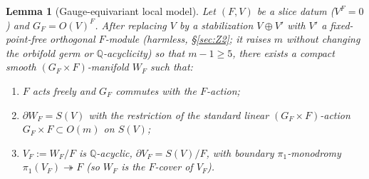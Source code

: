 \documentclass[12pt]{article}
\newtheorem{lemma}[theorem]{Lemma}
\theoremstyle{definition}
\begin{document}
\begin{lemma}[Gauge-equivariant local model]\label{lem:gaugefill}
Let $(F,V)$ be a slice datum ($V^F=0$) and $G_F=O(V)^F$. After replacing $V$ by
a stabilization $V\oplus V'$ with $V'$ a fixed-point-free orthogonal $F$-module
\textup{(}harmless, \S\ref{sec:Z2}; it raises $m$ without changing the orbifold
germ or $\mathbb{Q}$-acyclicity\textup{)} so that $m-1\ge5$, there exists a
compact smooth $(G_F\times F)$-manifold $W_F$ such that:
\begin{enumerate}
\item[\rm(i)] $F$ acts freely and $G_F$ commutes with the $F$-action;
\item[\rm(ii)] $\partial W_F=S(V)$ with the restriction of the standard linear
$(G_F\times F)$-action $G_F\times F\subset O(m)$ on $S(V)$;
\item[\rm(iii)] $V_F:=W_F/F$ is $\mathbb{Q}$-acyclic, $\partial V_F=S(V)/F$, with
boundary $\pi_1$-monodromy $\pi_1(V_F)\twoheadrightarrow F$ \textup{(}so $W_F$ is
the $F$-cover of $V_F$\textup{)}.
\end{enumerate}
\end{lemma}
\end{document}
